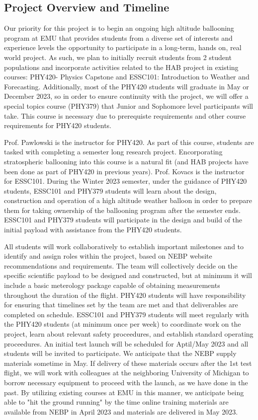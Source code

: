 \documentclass[12pt]{article}
\begin{document}
\subsection{Project Overview and Timeline}
Our priority for this project is to begin an ongoing high altitude ballooning program
at EMU that provides students from a diverse set of interests and experience levels
the opportunity to participate in a long-term, hands on, real world project. As such,
we plan to initially recruit students from 2 student populations and incorporate
activities related to the HAB project in existing courses: PHY420- Physics
Capstone and ESSC101: Introduction to Weather and Forecasting.
Additionally, most of the PHY420 students will graduate in May or December 2023, so in order to ensure continuity
with the project, we will offer a special topics course (PHY379) that Junior and Sophomore
level participants will take. This course is necessary due to prerequiste requirements and other
course requirements for PHY420 students.


Prof. Pawlowski is the instructor for PHY420. As part of this course, students are tasked with completing
a semester long research project. Encorporating stratospheric ballooning into this course is a
natural fit (and HAB projects have been done as part of PHY420 in previous years). Prof. Kovacs is the instructor for ESSC101. During the Winter 2023 semester, under the guidance of PHY420 students,
 ESSC101 and PHY379 students will learn about the design, construction and operation
of a high altitude weather balloon in order to prepare them for taking ownership of the
ballooning program after the semester ends. ESSC101 and PHY379 students will
participate in the design and build of the initial payload with assistance from the PHY420 students.

All students will work collaboratively to establish important milestones and to identify
and assign roles within the project, based on NEBP website recommendations and requirements.
The team will collectively decide on the specific scientific payload to be designed and constructed,
but at minimum it will include a basic meterology package capable of obtaining
measurements throughout the duration of the flight.
PHY420 students will have responsibility for ensuring that
timelines set by the team are met and that deliverables are completed on schedule.
ESSC101 and PHY379 students will
meet regularly with the PHY420 students (at minimum once per week) to coordinate work on the
project, learn about relevant safety proceedures, and establish standard operating proceedures.
An initial test launch will be scheduled for Aptil/May 2023 and all students will be invited
to participate. We anticipate that the NEBP supply materials sometime in May. If
delivery of these materials occurs after the 1st test flight, we will work with
colleagues at the neighboring University of Michigan to borrow necessary equipment
to proceed with the launch, as we have done in the past. By utilizing existing courses
at EMU in this manner, we anticipate being able to "hit the ground running" by the
time online training materials are available from NEBP in April 2023 and
materials are delivered in May 2023.
\end{document}
